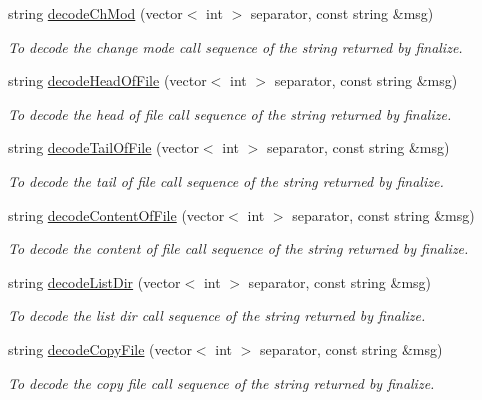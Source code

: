 \begin{DoxyCompactItemize}
string \hyperlink{classFMSMapper_ac9623d1fab6db25dfd2a38c698dd6484}{decodeChMod} (vector$<$ int $>$ separator, const string \&msg)
\begin{DoxyCompactList}\small\item\em To decode the change mode call sequence of the string returned by finalize. \item\end{DoxyCompactList}\item 
string \hyperlink{classFMSMapper_aa232972b7724b195d9cdfcb7f7492e7d}{decodeHeadOfFile} (vector$<$ int $>$ separator, const string \&msg)
\begin{DoxyCompactList}\small\item\em To decode the head of file call sequence of the string returned by finalize. \item\end{DoxyCompactList}\item 
string \hyperlink{classFMSMapper_a98ad79820fb05c4f13d45a9d1edce6ec}{decodeTailOfFile} (vector$<$ int $>$ separator, const string \&msg)
\begin{DoxyCompactList}\small\item\em To decode the tail of file call sequence of the string returned by finalize. \item\end{DoxyCompactList}\item 
string \hyperlink{classFMSMapper_a37ae6693b65586791b470df4b562c19c}{decodeContentOfFile} (vector$<$ int $>$ separator, const string \&msg)
\begin{DoxyCompactList}\small\item\em To decode the content of file call sequence of the string returned by finalize. \item\end{DoxyCompactList}\item 
string \hyperlink{classFMSMapper_a3fed4d22cb0cca80d9c495a5f65f0c6c}{decodeListDir} (vector$<$ int $>$ separator, const string \&msg)
\begin{DoxyCompactList}\small\item\em To decode the list dir call sequence of the string returned by finalize. \item\end{DoxyCompactList}\item 
string \hyperlink{classFMSMapper_a8728985ad72c9ee63d5a0a4b4cde845f}{decodeCopyFile} (vector$<$ int $>$ separator, const string \&msg)
\begin{DoxyCompactList}\small\item\em To decode the copy file call sequence of the string returned by finalize. \item\end{DoxyCompactList}\item 

\end{DoxyCompactItemize}
